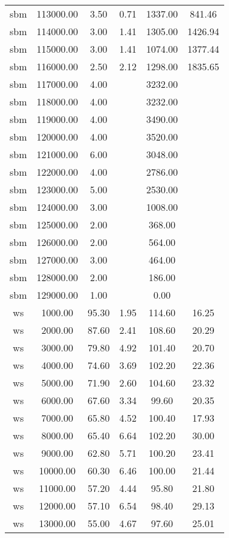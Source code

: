 \begin{table}[ht]
\begin{table}[ht]
\begin{tabular}{|cccccc}
  sbm & 113000.00 & 3.50 & 0.71 & 1337.00 & 841.46 \\ 
  sbm & 114000.00 & 3.00 & 1.41 & 1305.00 & 1426.94 \\ 
  sbm & 115000.00 & 3.00 & 1.41 & 1074.00 & 1377.44 \\ 
  sbm & 116000.00 & 2.50 & 2.12 & 1298.00 & 1835.65 \\ 
  sbm & 117000.00 & 4.00 &  & 3232.00 &  \\ 
  sbm & 118000.00 & 4.00 &  & 3232.00 &  \\ 
  sbm & 119000.00 & 4.00 &  & 3490.00 &  \\ 
  sbm & 120000.00 & 4.00 &  & 3520.00 &  \\ 
  sbm & 121000.00 & 6.00 &  & 3048.00 &  \\ 
  sbm & 122000.00 & 4.00 &  & 2786.00 &  \\ 
  sbm & 123000.00 & 5.00 &  & 2530.00 &  \\ 
  sbm & 124000.00 & 3.00 &  & 1008.00 &  \\ 
  sbm & 125000.00 & 2.00 &  & 368.00 &  \\ 
  sbm & 126000.00 & 2.00 &  & 564.00 &  \\ 
  sbm & 127000.00 & 3.00 &  & 464.00 &  \\ 
  sbm & 128000.00 & 2.00 &  & 186.00 &  \\ 
  sbm & 129000.00 & 1.00 &  & 0.00 &  \\ 
  ws & 1000.00 & 95.30 & 1.95 & 114.60 & 16.25 \\ 
  ws & 2000.00 & 87.60 & 2.41 & 108.60 & 20.29 \\ 
  ws & 3000.00 & 79.80 & 4.92 & 101.40 & 20.70 \\ 
  ws & 4000.00 & 74.60 & 3.69 & 102.20 & 22.36 \\ 
  ws & 5000.00 & 71.90 & 2.60 & 104.60 & 23.32 \\ 
  ws & 6000.00 & 67.60 & 3.34 & 99.60 & 20.35 \\ 
  ws & 7000.00 & 65.80 & 4.52 & 100.40 & 17.93 \\ 
  ws & 8000.00 & 65.40 & 6.64 & 102.20 & 30.00 \\ 
  ws & 9000.00 & 62.80 & 5.71 & 100.20 & 23.41 \\ 
  ws & 10000.00 & 60.30 & 6.46 & 100.00 & 21.44 \\ 
  ws & 11000.00 & 57.20 & 4.44 & 95.80 & 21.80 \\ 
  ws & 12000.00 & 57.10 & 6.54 & 98.40 & 29.13 \\ 
  ws & 13000.00 & 55.00 & 4.67 & 97.60 & 25.01 \\ 

\end{tabular}
\end{table}
\end{table}
